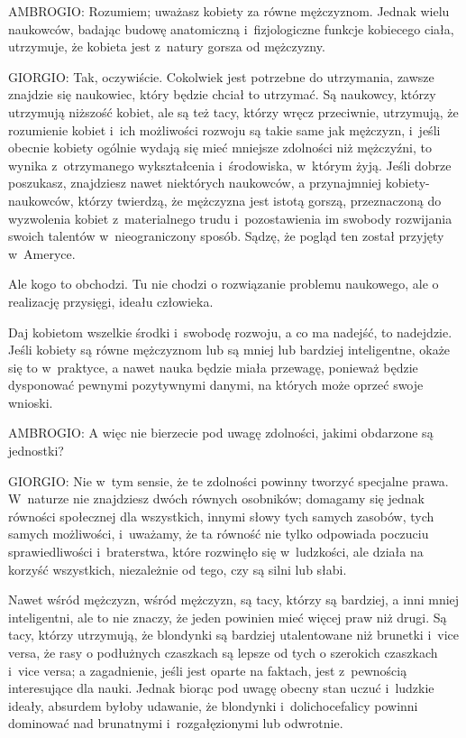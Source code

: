 \documentclass[oneside,polish,11pt,sfheadings]{mwbk}
\begin{document}
 
\noindent AMBROGIO: Rozumiem; uważasz kobiety za równe mężczyznom. Jednak wielu naukowców, badając budowę anatomiczną i~fizjologiczne funkcje kobiecego ciała, utrzymuje, że kobieta jest z~natury gorsza od mężczyzny. 




 
\noindent GIORGIO: Tak, oczywiście. Cokolwiek jest potrzebne do utrzymania, zawsze znajdzie się naukowiec, który będzie chciał to
utrzymać. Są naukowcy, którzy utrzymują niższość kobiet, ale są też tacy, którzy wręcz przeciwnie, utrzymują, że
rozumienie kobiet i~ich możliwości rozwoju są takie same jak mężczyzn, i~jeśli obecnie kobiety ogólnie wydają się mieć
mniejsze zdolności niż mężczyźni, to wynika z~otrzymanego wykształcenia i~środowiska, w~którym żyją. Jeśli dobrze
poszukasz, znajdziesz nawet niektórych naukowców, a przynajmniej kobiety-naukowców, którzy twierdzą, że mężczyzna jest
istotą gorszą, przeznaczoną do wyzwolenia kobiet z~materialnego trudu i~pozostawienia im swobody rozwijania swoich
talentów w~nieograniczony sposób. Sądzę, że pogląd ten został przyjęty w~Ameryce. 

 
Ale kogo to obchodzi. Tu nie chodzi o rozwiązanie problemu naukowego, ale o realizację przysięgi, ideału człowieka. 

 
Daj kobietom wszelkie środki i~swobodę rozwoju, a co ma nadejść, to nadejdzie. Jeśli kobiety są równe mężczyznom lub są
mniej lub bardziej inteligentne, okaże się to w~praktyce, a nawet nauka będzie miała przewagę, ponieważ będzie
dysponować pewnymi pozytywnymi danymi, na których może oprzeć swoje wnioski. 




 
\noindent AMBROGIO: A więc nie bierzecie pod uwagę zdolności, jakimi obdarzone są jednostki? 




 
\noindent GIORGIO: Nie w~tym sensie, że te zdolności powinny tworzyć specjalne prawa. W~naturze nie znajdziesz dwóch równych
osobników; domagamy się jednak równości społecznej dla wszystkich, innymi słowy tych samych zasobów, tych samych
możliwości, i~uważamy, że ta równość nie tylko odpowiada poczuciu sprawiedliwości i~braterstwa, które rozwinęło się w~ludzkości, ale działa na korzyść wszystkich, niezależnie od tego, czy są silni lub słabi. 

 
Nawet wśród mężczyzn, wśród mężczyzn, są tacy, którzy są bardziej, a inni mniej inteligentni, ale to nie znaczy, że
jeden powinien mieć więcej praw niż drugi. Są tacy, którzy utrzymują, że blondynki są bardziej utalentowane niż
brunetki i~vice versa, że rasy o podłużnych czaszkach są lepsze od tych o szerokich czaszkach i~vice versa; a
zagadnienie, jeśli jest oparte na faktach, jest z~pewnością interesujące dla nauki. Jednak biorąc pod uwagę obecny stan
uczuć i~ludzkie ideały, absurdem byłoby udawanie, że blondynki i~dolichocefalicy powinni dominować nad brunatnymi i~rozgałęzionymi lub odwrotnie. 
\end{document}
